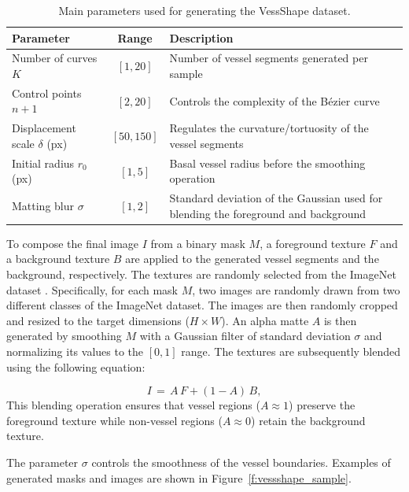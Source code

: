 \documentclass[%
reprint,
nofootinbib,
 amsmath,amssymb,
aps,
superscriptaddress,
showkeys,
longbibliography
]{revtex4-1}
\begin{document}
\begin{table}[t]
\caption{Main parameters used for generating the VessShape dataset.}
\label{tab:vessshape_params}
\centering
\begin{tabularx}{\textwidth}{l c X}
\hline
    \textbf{Parameter} & \textbf{Range} & \textbf{Description} \\
\hline
Number of curves $K$ & $[1,20]$ & Number of vessel segments generated per sample \\
Control points $n{+}1$ & $[2,20]$ & Controls the complexity of the Bézier curve \\
Displacement scale $\delta$ (px) & $[50,150]$ & Regulates the curvature/tortuosity of the vessel segments \\
Initial radius $r_{0}$ (px) & $[1,5]$ & Basal vessel radius before the smoothing operation \\
Matting blur $\sigma$ & $[1,2]$ & Standard deviation of the Gaussian used for blending the foreground and background \\

\hline
\end{tabularx}
\end{table}

To compose the final image $I$ from a binary mask $M$, a foreground texture $F$ and a background texture $B$ are applied to the generated vessel segments and the background, respectively. The textures are randomly selected from the ImageNet dataset \cite{JiaDeng2009}. Specifically, for each mask $M$, two images are randomly drawn from two different classes of the ImageNet dataset. The images are then randomly cropped and resized to the target dimensions ($H \times W$). An alpha matte $A$ is then generated by smoothing $M$ with a Gaussian filter of standard deviation $\sigma$ and normalizing its values to the $[0, 1]$ range. The textures are subsequently blended using the following equation:

\begin{equation}
I \,=\, A\,F + (1-A)\,B,
\label{eq:compose}
\end{equation}
This blending operation ensures that vessel regions ($A \approx 1$) preserve the foreground texture while non-vessel regions ($A \approx 0$) retain the background texture. 

The parameter $\sigma$ controls the smoothness of the vessel boundaries. Examples of generated masks and images are shown in Figure~\ref{f:vessshape_sample}.
\end{document}
